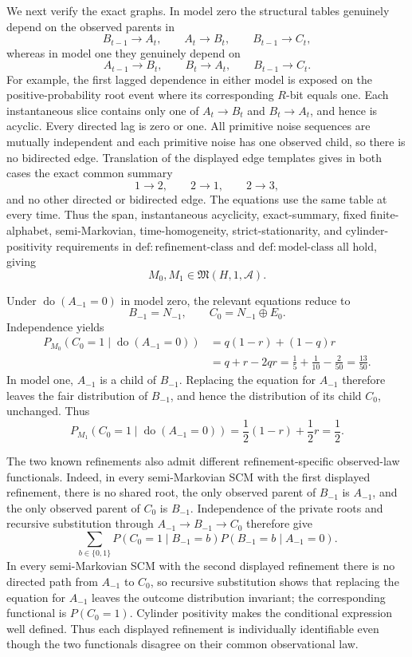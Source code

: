 We next verify the exact graphs.  In model zero the structural tables genuinely depend on the observed parents in
\[
 B_{t-1}\to A_t,\qquad A_t\to B_t,\qquad B_{t-1}\to C_t,
\]
whereas in model one they genuinely depend on
\[
 A_{t-1}\to B_t,\qquad B_t\to A_t,\qquad B_{t-1}\to C_t.
\]
For example, the first lagged dependence in either model is exposed on the positive-probability root event where its corresponding \(R\)-bit equals one.  Each instantaneous slice contains only one of \(A_t\to B_t\) and \(B_t\to A_t\), and hence is acyclic.  Every directed lag is zero or one.  All primitive noise sequences are mutually independent and each primitive noise has one observed child, so there is no bidirected edge.  Translation of the displayed edge templates gives in both cases the exact common summary
\[
 1\to2,\qquad 2\to1,\qquad 2\to3,
\]
and no other directed or bidirected edge.  The equations use the same table at every time.  Thus the span, instantaneous acyclicity, exact-summary, fixed finite-alphabet, semi-Markovian, time-homogeneity, strict-stationarity, and cylinder-positivity requirements in \(\mathrm{def:refinement\text{-}class}\) and \(\mathrm{def:model\text{-}class}\) all hold, giving
\[
 M_0,M_1\in\mathfrak M(H,1,\mathcal A).
\]

Under \(\operatorname{do}(A_{-1}=0)\) in model zero, the relevant equations reduce to
\[
 B_{-1}=N_{-1},\qquad C_0=N_{-1}\oplus E_0.
\]
Independence yields
\[
 \begin{aligned}
 P_{M_0}(C_0=1\mid\operatorname{do}(A_{-1}=0))
 &=q(1-r)+(1-q)r\\
 &=q+r-2qr
 =\frac15+\frac1{10}-\frac2{50}
 =\frac{13}{50}.
 \end{aligned}
\]
In model one, \(A_{-1}\) is a child of \(B_{-1}\).  Replacing the equation for \(A_{-1}\) therefore leaves the fair distribution of \(B_{-1}\), and hence the distribution of its child \(C_0\), unchanged.  Thus
\[
 P_{M_1}(C_0=1\mid\operatorname{do}(A_{-1}=0))
 =\frac12(1-r)+\frac12r=\frac12.
\]

The two known refinements also admit different refinement-specific observed-law functionals.  Indeed, in every semi-Markovian SCM with the first displayed refinement, there is no shared root, the only observed parent of \(B_{-1}\) is \(A_{-1}\), and the only observed parent of \(C_0\) is \(B_{-1}\).  Independence of the private roots and recursive substitution through \(A_{-1}\to B_{-1}\to C_0\) therefore give
\[
 \sum_{b\in\{0,1\}}P(C_0=1\mid B_{-1}=b)P(B_{-1}=b\mid A_{-1}=0).
\]
In every semi-Markovian SCM with the second displayed refinement there is no directed path from \(A_{-1}\) to \(C_0\), so recursive substitution shows that replacing the equation for \(A_{-1}\) leaves the outcome distribution invariant; the corresponding functional is \(P(C_0=1)\).  Cylinder positivity makes the conditional expression well defined.  Thus each displayed refinement is individually identifiable even though the two functionals disagree on their common observational law.


